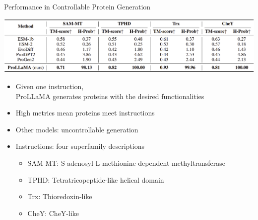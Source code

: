 \begin{frame}{Performance in Controllable Protein Generation}%
	\begin{center}
		\includegraphics[scale=0.21]{tables/controlled_generation_comparison.png}
	\end{center}
	\vspace{-1em}
	\begin{itemize}
		\item Given one instruction, \\ProLLaMA generates proteins with the desired functionalities
		\item High metrics mean proteins meet instructions
		\item Other models: uncontrollable generation
		\item Instructions: four superfamily descriptions
		\begin{itemize}
			\item SAM-MT: S-adenosyl-L-methionine-dependent methyltransferase
			\item TPHD: Tetratricopeptide-like helical domain
			\item Trx: Thioredoxin-like 
			\item CheY: CheY-like
		\end{itemize}
	\end{itemize}
\end{frame}